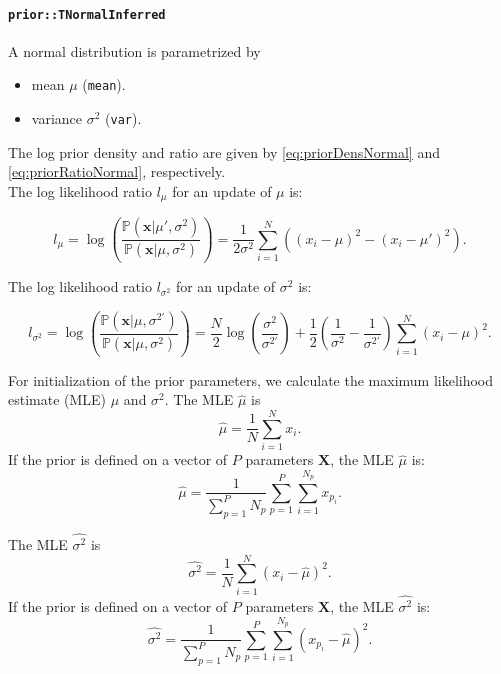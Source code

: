\documentclass[a4paper,11pt]{article}
\def\X{\boldsymbol{X}}
\def\p{\mathbb{P}}
\newcommand{\class}[1]{\texttt{#1}}
\newcommand{\privparam}[1]{\texttt{\textunderscore #1}}
\begin{document}
\paragraph{\class{prior::TNormalInferred}}
A normal distribution is parametrized by
\begin{itemize}
 \item mean $\mu$ (\privparam{mean}).
 \item variance $\sigma^2$ (\privparam{var}).
\end{itemize}
The log prior density and ratio are given by \eqref{eq:priorDensNormal} and \eqref{eq:priorRatioNormal}, respectively.\\
The log likelihood ratio $l_\mu$ for an update of $\mu$ is:

\begin{equation*}
 l_\mu = \log \left(\frac{\p(\boldsymbol x | \mu', \sigma^2)}{\p(\boldsymbol x | \mu, \sigma^2)} \right) = \frac{1}{2\sigma^2} \sum_{i=1}^N \left( (x_{i} - \mu)^2 - (x_{i} - \mu')^2 \right).
\end{equation*}

The log likelihood ratio $l_{\sigma^2}$ for an update of $\sigma^2$ is:

\begin{equation*}
 l_{\sigma^2} = \log \left(\frac{\p(\boldsymbol x | \mu, \sigma^{2'})}{\p(\boldsymbol x | \mu, \sigma^2)} \right) = \frac{N}{2} \log \left( \frac{\sigma^2}{\sigma^{2'}} \right)+ \frac{1}{2}\left(\frac{1}{\sigma^2} - \frac{1}{\sigma^{2'}}\right)\sum_{i=1}^N(x_{i} - \mu)^2.
\end{equation*}

For initialization of the prior parameters, we calculate the maximum likelihood estimate (MLE) $\mu$ and $\sigma^2$. The MLE $\hat\mu$ is
\begin{equation}\label{eq:MLE_mu_univariate}
 \hat \mu = \frac{1}{N} \sum_{i=1}^N x_i.
\end{equation}
If the prior is defined on a vector of $P$ parameters $\X$, the MLE $\hat\mu$ is:
\begin{equation*}
 \hat \mu = \frac{1}{\sum_{p=1}^P N_p} \sum_{p=1}^P \sum_{i=1}^{N_p} x_{p_i}.
\end{equation*}

The MLE $\hat{ \sigma^2}$ is
\begin{equation}\label{eq:MLE_var_univariate}
 \hat{ \sigma^2} = \frac{1}{N} \sum_{i=1}^N (x_i - \hat \mu)^2.
\end{equation}
If the prior is defined on a vector of $P$ parameters $\X$, the MLE $\hat{ \sigma^2}$ is:
\begin{equation*}
 \hat{ \sigma^2} = \frac{1}{\sum_{p=1}^P N_p} \sum_{p=1}^P \sum_{i=1}^{N_p} (x_{p_i} - \hat \mu)^2.
\end{equation*}
\end{document}
